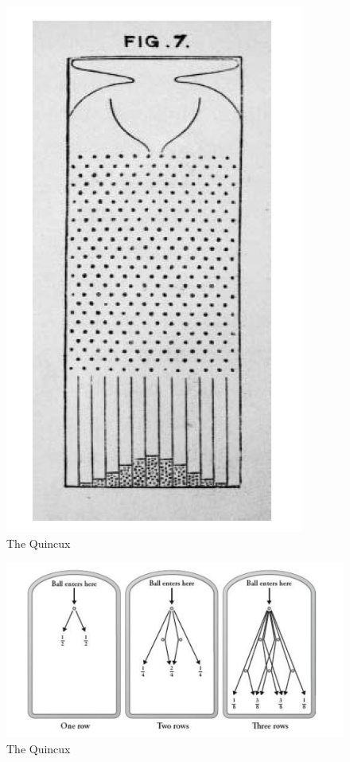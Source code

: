 \documentclass[11pt]{article}
\begin{document}
\begin{figure}[htp]
\centering
\includegraphics[scale=0.3]{game.png}
\caption{The Quincux}
\label{}
\end{figure}

\begin{figure}[htp]
\centering
\includegraphics[scale=0.3]{game2.png}
\caption{The Quincux}
\label{}
\end{figure}
\end{document}
